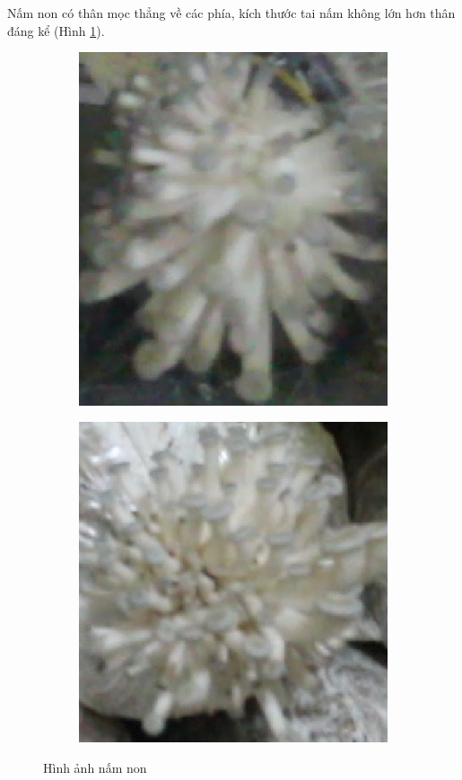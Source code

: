 Nấm non có thân mọc thẳng về các phía, kích thước tai nấm không lớn hơn thân đáng kể (Hình \ref{fig:young}).

\begin{figure}[H]
    \centering
        \begin{subfigure}{.5\textwidth}
        \includegraphics[width=0.8\linewidth]{images/young2.png}
    \end{subfigure}%
    \begin{subfigure}{.5\textwidth}
        \includegraphics[width=0.8\linewidth]{images/young3.png}
    \end{subfigure}
    \caption{Hình ảnh nấm non}
    \label{fig:young}
\end{figure}

